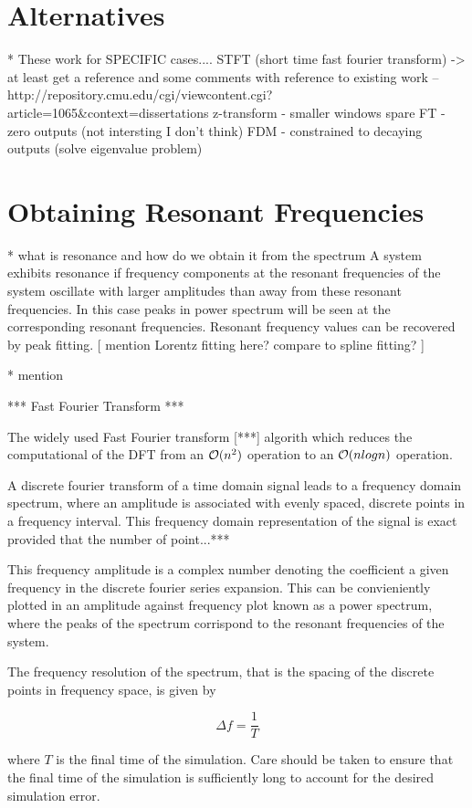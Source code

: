 \section{Alternatives}
* These work for SPECIFIC cases....
STFT (short time fast fourier transform) -> at least get a reference and some
comments with reference to existing work
 -- http://repository.cmu.edu/cgi/viewcontent.cgi?article=1065&context=dissertations
z-transform - smaller windows
spare FT - zero outputs (not intersting I don't think)
FDM - constrained to decaying outputs (solve eigenvalue problem)


\section{Obtaining Resonant Frequencies}
* what is resonance and how do we obtain it from the spectrum
A system exhibits resonance if frequency components at the resonant frequencies of the system oscillate with larger amplitudes than away from these resonant frequencies. In this case peaks in power spectrum will be seen at the corresponding resonant frequencies. Resonant frequency values can be recovered by peak fitting. [ mention Lorentz fitting here? compare to spline fitting? ]

* mention 

*** Fast Fourier Transform ***

The widely used Fast Fourier transform [***] algorith which reduces the computational of the DFT from an $\mathcal{O}(n^2)$ operation to an $\mathcal{O}(n log n)$ operation.

A discrete fourier transform of a time domain signal leads to a frequency domain spectrum, where an amplitude is associated with evenly spaced, discrete points in a frequency interval. This frequency domain representation of the signal is exact provided that the number of point...***

This frequency amplitude is a complex number denoting the coefficient a given frequency in the discrete fourier series expansion.  This can be convieniently plotted in an amplitude against frequency plot known as a power spectrum, where the peaks of the spectrum corrispond to the resonant frequencies of the system.

The frequency resolution of the spectrum, that is the spacing of the discrete points in frequency space, is given by

$$
\Delta f = \frac{1}{T}
$$

where $T$ is the final time of the simulation. Care should be taken to ensure that the final time of the simulation is sufficiently long to account for the desired simulation error.

